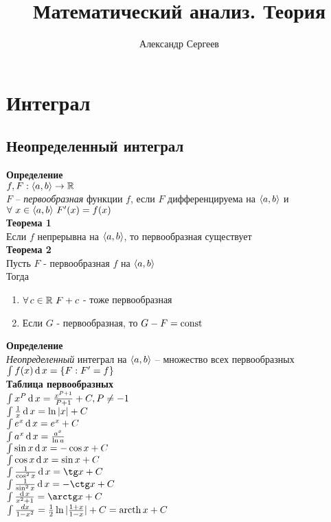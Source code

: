 \documentclass[12pt]{article}
\title{Математический анализ. Теория}
\author{Александр Сергеев}
\date{}
\begin{document}
\maketitle
\section{Интеграл}
\subsection{Неопределенный интеграл}
\textbf{Определение}\\
$f,F: \langle a, b \rangle \rightarrow \mathbb{R}$\\
$F$ -- \textit{первообразная} функции $f$, если $F$ дифференцируема на $\langle a, b \rangle$ и $\forall\,\,x\in \langle a, b\rangle\ F'(x) = f(x)$\\
\textbf{Теорема 1}\\
Если $f$ непрерывна на $\langle a, b \rangle$, то первообразная существует\\
\textbf{Теорема 2}\\
Пусть $F$ - первообразная $f$ на $\langle a, b\rangle$\\
Тогда
\begin{enumerate}
    \item $\forall\, c \in \mathbb{R}\ F+c$ - тоже первообразная
    \item Если $G$ - первообразная, то $G-F = \operatorname{const}$
\end{enumerate}
\textbf{Определение}\\
\textit{Неопределенный} интеграл на $\langle a, b \rangle$ -- множество всех первообразных\\
$\int f(x)\operatorname{d} x = \{ F: F'=f \}$\\
\textbf{Таблица первообразных}\\
$\int x^P \operatorname{d} x = \frac{x^{P+1}}{P+1} + C, P \neq -1$\\
$\int \frac1x \operatorname{d} x = \ln |x| + C$\\
$\int e^x\operatorname{d} x = e^x + C$\\
$\int a^x\operatorname{d} x = \frac{a^x}{\ln a}$\\
$\int \sin x \operatorname{d} x = -\cos x + C$\\
$\int \cos x \operatorname{d} x = \sin x + C$\\
$\int \frac1{\cos^2 x}\df x = \tg x + C$\\
$\int \frac1{\sin^2 x}\df x = -\ctg x + C$\\
$\int \frac{\df x}{x^2 + 1} = \arctg x + C$\\
$\int \frac{dx}{1-x^2} = \frac12 \ln |\frac{1+x}{1-x}| + C = \operatorname{arcth} x + C$\\
\end{document}
